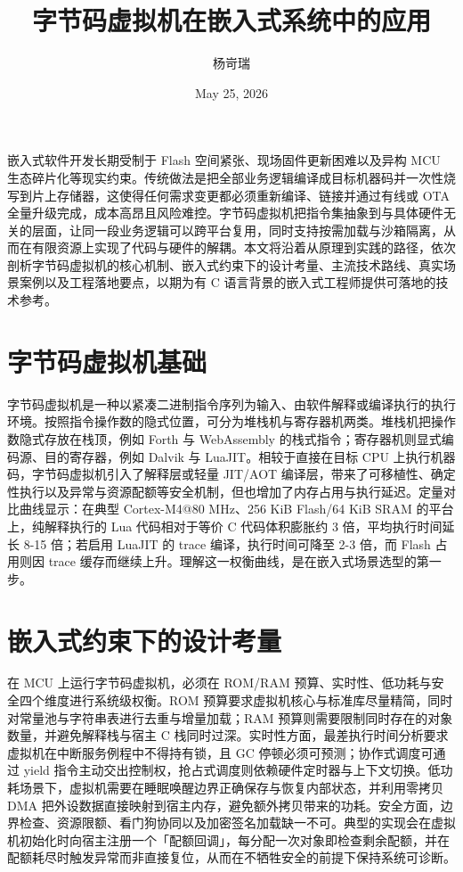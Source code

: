 \title{字节码虚拟机在嵌入式系统中的应用}
\author{杨岢瑞}
\date{May 25, 2026}
\maketitle
嵌入式软件开发长期受制于 Flash 空间紧张、现场固件更新困难以及异构 MCU 生态碎片化等现实约束。传统做法是把全部业务逻辑编译成目标机器码并一次性烧写到片上存储器，这使得任何需求变更都必须重新编译、链接并通过有线或 OTA 全量升级完成，成本高昂且风险难控。字节码虚拟机把指令集抽象到与具体硬件无关的层面，让同一段业务逻辑可以跨平台复用，同时支持按需加载与沙箱隔离，从而在有限资源上实现了代码与硬件的解耦。本文将沿着从原理到实践的路径，依次剖析字节码虚拟机的核心机制、嵌入式约束下的设计考量、主流技术路线、真实场景案例以及工程落地要点，以期为有 C 语言背景的嵌入式工程师提供可落地的技术参考。\par
\chapter{字节码虚拟机基础}
字节码虚拟机是一种以紧凑二进制指令序列为输入、由软件解释或编译执行的执行环境。按照指令操作数的隐式位置，可分为堆栈机与寄存器机两类。堆栈机把操作数隐式存放在栈顶，例如 Forth 与 WebAssembly 的栈式指令；寄存器机则显式编码源、目的寄存器，例如 Dalvik 与 LuaJIT。相较于直接在目标 CPU 上执行机器码，字节码虚拟机引入了解释层或轻量 JIT/AOT 编译层，带来了可移植性、确定性执行以及异常与资源配额等安全机制，但也增加了内存占用与执行延迟。定量对比曲线显示：在典型 Cortex-M4@80 MHz、256 KiB Flash/64 KiB SRAM 的平台上，纯解释执行的 Lua 代码相对于等价 C 代码体积膨胀约 3 倍，平均执行时间延长 8-15 倍；若启用 LuaJIT 的 trace 编译，执行时间可降至 2-3 倍，而 Flash 占用则因 trace 缓存而继续上升。理解这一权衡曲线，是在嵌入式场景选型的第一步。\par
\chapter{嵌入式约束下的设计考量}
在 MCU 上运行字节码虚拟机，必须在 ROM/RAM 预算、实时性、低功耗与安全四个维度进行系统级权衡。ROM 预算要求虚拟机核心与标准库尽量精简，同时对常量池与字符串表进行去重与增量加载；RAM 预算则需要限制同时存在的对象数量，并避免解释栈与宿主 C 栈同时过深。实时性方面，最差执行时间分析要求虚拟机在中断服务例程中不得持有锁，且 GC 停顿必须可预测；协作式调度可通过 yield 指令主动交出控制权，抢占式调度则依赖硬件定时器与上下文切换。低功耗场景下，虚拟机需要在睡眠唤醒边界正确保存与恢复内部状态，并利用零拷贝 DMA 把外设数据直接映射到宿主内存，避免额外拷贝带来的功耗。安全方面，边界检查、资源限额、看门狗协同以及加密签名加载缺一不可。典型的实现会在虚拟机初始化时向宿主注册一个「配额回调」，每分配一次对象即检查剩余配额，并在配额耗尽时触发异常而非直接复位，从而在不牺牲安全的前提下保持系统可诊断。\par
